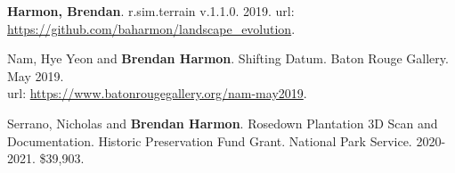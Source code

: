 \documentclass[10pt]{developercv} %
\begin{document}
\clearpage




\nocite{*}
\setlength\bibitemsep{0.75em}

\printbibliography[title={\cvsect{Books}}, type=book, heading=subbibliography]

\printbibliography[title={\cvsect{Papers}}, keyword=peer_reviewed, heading=subbibliography]

\printbibliography[title={\cvsect{Chapters}}, type=incollection, heading=subbibliography]

\printbibliography[title={\cvsect{Select presentations}}, type=unpublished, heading=subbibliography]

\printbibliography[title={\cvsect{Reports}}, type=report, heading=subbibliography]



\textbf{Harmon, Brendan}. r.sim.terrain v.1.1.0. 2019. url: \url{https://github.com/baharmon/landscape_evolution}.



Nam, Hye Yeon and \textbf{Brendan Harmon}. Shifting Datum. Baton Rouge Gallery. May 2019.\\
url: \url{https://www.batonrougegallery.org/nam-may2019}.



Serrano, Nicholas and \textbf{Brendan Harmon}. 
Rosedown Plantation 3D Scan and Documentation. 
Historic Preservation Fund Grant. National Park Service. 
2020-2021. \$39,903.\\
\end{document}
